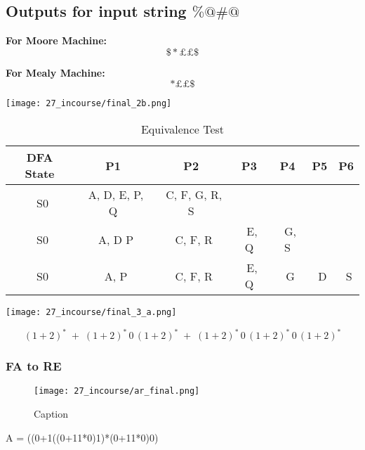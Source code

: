 \documentclass[8pt]{article}
\begin{document}
\bigskip


\subsection*{Outputs for input string \(\% @ \# @\)}

\textbf{For Moore Machine:}
\[
\$ * \pounds \pounds \$
\]

\textbf{For Mealy Machine:}
\[
* \pounds \pounds \$
\]

\begin{center}
    \texttt{[image: 27\_incourse/final\_2b.png]} %
\end{center}


\begin{table}[H]
    \centering
    \renewcommand{\arraystretch}{1.3} %
    \begin{tabular}{|c|c|c|c|c|c|c|}
        \hline
        \rowcolor{gray!20} %
        \textbf{DFA State} & \textbf{P1} & \textbf{P2} & \textbf{P3} & \textbf{P4} & \textbf{P5} & \textbf{P6} \\
        \hline
        \ S0 & \ A, D, E, P, Q & \ C, F, G, R, S & \ & \ &\ &\ \\
        \hline
         \ S0 & \ A, D P & \ C, F, R & \ E, Q & \ G, S &\ &\ \\
        \hline
         \ S0 & \ A,  P & \ C, F, R & \ E, Q & \ G &\ D  &\ S \\
        \hline
        
       
    \end{tabular}
    \caption{Equivalence Test}
    \label{tab:dfa_transition}
\end{table}

\begin{center}
    \texttt{[image: 27\_incourse/final\_3\_a.png]} %
\end{center}

\[
(1 + 2)^{*} \;+\; (1 + 2)^{*} \, 0 \, (1 + 2)^{*} \;+\; (1 + 2)^{*} \, 0 \, (1 + 2)^{*} \, 0 \, (1 + 2)^{*}
\]
\subsubsection{FA to RE}
\begin{figure}[H]
    \centering
    \texttt{[image: 27\_incourse/ar\_final.png]}
    \caption{Caption}
    \label{fig:placeholder}
\end{figure}
A = ((0+1((0+11*0)1)*(0+11*0)0)
\end{document}
